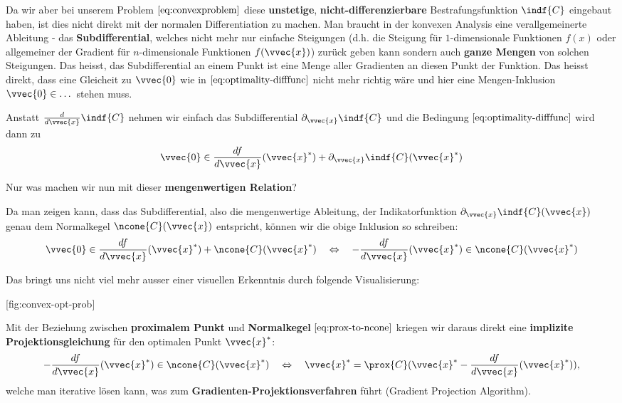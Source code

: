 \documentclass[
  12pt,
  british,
  a4paper,
  twoside,
  titlepage,
  openright,
  numbers=noenddot,
  chapterprefix=true,
  headings=optiontohead,
  svgnames,
  dvipsnames]{scrreprt}
\begin{document}
Da wir aber bei unserem Problem \(\eqref{eq:convexproblem}\) diese
\textbf{unstetige}, \textbf{nicht-differenzierbare} Bestrafungsfunktion
\(\indf{C}\) eingebaut haben, ist dies nicht direkt mit der normalen
Differentiation zu machen. Man braucht in der konvexen Analysis eine
verallgemeinerte Ableitung - das \textbf{Subdifferential}, welches nicht
mehr nur einfache Steigungen (d.h. die Steigung für \(1\)-dimensionale
Funktionen \(f(x)\) oder allgemeiner der Gradient für \(n\)-dimensionale
Funktionen \(f(\vvec{x})\)) zurück geben kann sondern auch \textbf{ganze
Mengen} von solchen Steigungen. Das heisst, das Subdifferential an einem
Punkt ist eine Menge aller Gradienten an diesen Punkt der Funktion. Das
heisst direkt, dass eine Gleicheit zu \(\vvec{0}\) wie in
\(\eqref{eq:optimality-difffunc}\) nicht mehr richtig wäre und hier eine
Mengen-Inklusion \(\vvec{0} \in \dots\) stehen muss.

Anstatt \(\frac{d}{d\vvec{x}}\indf{C}\) nehmen wir einfach das
Subdifferential \(\partial_{\vvec{x}} \indf{C}\) und die Bedingung
\(\eqref{eq:optimality-difffunc}\) wird dann zu \begin{align}
\label{eq:optimality-strict-convex}
\vvec{0} \in \frac{df}{d\vvec{x}}(\vvec{x}^*) + \partial_{\vvec{x}} \indf{C}(\vvec{x}^*)
\end{align}

Nur was machen wir nun mit dieser \textbf{mengenwertigen Relation}?

Da man zeigen kann, dass das Subdifferential, also die mengenwertige
Ableitung, der Indikatorfunktion
\(\partial_{\vvec{x}} \indf{C}(\vvec{x})\) genau dem Normalkegel
\(\ncone{C}(\vvec{x})\) entspricht, können wir die obige Inklusion so
schreiben: \begin{align}
\vvec{0} \in \frac{df}{d\vvec{x}}(\vvec{x}^*) + \ncone{C}(\vvec{x}^*) \quad \Leftrightarrow \quad -\frac{df}{d\vvec{x}}(\vvec{x}^*) \in \ncone{C}(\vvec{x}^*)
\label{eq:optimality-strict-convex-2}
\end{align}

Das bringt uns nicht viel mehr ausser einer visuellen Erkenntnis durch
folgende Visualisierung:

[fig:convex-opt-prob]

Mit der Beziehung zwischen \textbf{proximalem Punkt} und
\textbf{Normalkegel} \(\eqref{eq:prox-to-ncone}\) kriegen wir daraus
direkt eine \textbf{implizite Projektionsgleichung} für den optimalen
Punkt \(\vvec{x}^*\): \begin{align}
-\frac{df}{d\vvec{x}}(\vvec{x}^*) \in \ncone{C}(\vvec{x}^*) \quad \Leftrightarrow \quad \vvec{x}^* = \prox{C}(\vvec{x}^* - \frac{df}{d\vvec{x}}(\vvec{x}^*)),
\end{align} welche man iterative lösen kann, was zum
\textbf{Gradienten-Projektionsverfahren} führt (Gradient Projection
Algorithm).
\end{document}
